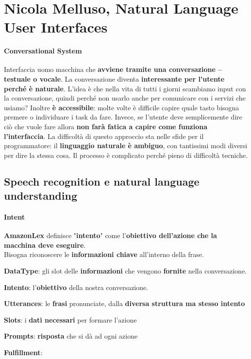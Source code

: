 \documentclass[10pt]{article}
\begin{document}
\section{Nicola Melluso, Natural Language User Interfaces}
\paragraph{Conversational System} Interfaccia uomo macchina che \textbf{avviene tramite una conversazione -- testuale o vocale}. La conversazione diventa \textbf{interessante per l'utente perché è naturale}. L'idea è che nella vita di tutti i giorni scambiamo input con la conversazione, quindi perché non usarlo anche per comunicare con i servizi che usiamo? Inoltre \textbf{è accessibile}: molte volte è difficile capire quale tasto bisogna premere o individuare i task da fare. Invece, se l'utente deve semplicemente dire ciò che vuole fare allora \textbf{non farà fatica a capire come funziona l'interfaccia}.
La difficoltà di questo approccio sta nelle sfide per il programmatore: il \textbf{linguaggio naturale è ambiguo}, con tantissimi modi diversi per dire la stessa cosa. Il processo è complicato perché pieno di difficoltà tecniche.
\subsection{Speech recognition e natural language understanding}
\paragraph{Intent} \textbf{AmazonLex} definisce "\textbf{intento}" come l'\textbf{obiettivo dell'azione che la macchina deve eseguire}.\\
Bisogna riconoscere le \textbf{informazioni chiave} all'interno della frase.
\begin{list}{}{}
	\item \textbf{DataType}: gli slot delle \textbf{informazioni} che vengono \textbf{fornite} nella conversazione.
	\item \textbf{Intento}: l'\textbf{obiettivo} della nostra conversazione.
	\item \textbf{Utterances}: le \textbf{frasi} pronunciate, dalla \textbf{diversa struttura ma stesso intento}
	\item \textbf{Slots}: i \textbf{dati necessari} per formare l'azione
	\item \textbf{Prompts}: \textbf{risposta} che si dà ad ogni azione
	\item \textbf{Fulfillment}: 
\end{list}
\end{document}
